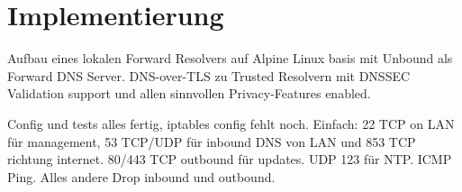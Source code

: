 \chapter{Implementierung}


\begin{draft}
Aufbau eines lokalen Forward Resolvers auf Alpine Linux basis mit Unbound als Forward DNS Server.
DNS-over-TLS zu Trusted Resolvern mit DNSSEC Validation support und allen sinnvollen Privacy-Features enabled. 

Config und tests alles fertig, iptables config fehlt noch. Einfach: 22 TCP on LAN für management, 53 TCP/UDP für inbound DNS von LAN und 853 TCP richtung internet. 80/443 TCP outbound für updates. UDP 123 für NTP. ICMP Ping. Alles andere Drop inbound und outbound.
\end{draft}
